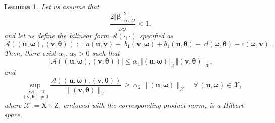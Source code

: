 \documentclass[reqno,a4paper]{article}
\numberwithin{equation}{section}
\newcommand\bu{\boldsymbol{u}}
\newcommand\bv{\boldsymbol{v}}
\newcommand\bbbeta{\boldsymbol{\beta}}
\newcommand\disp{\displaystyle}
\renewcommand\O{\Omega}
\newcommand\Z{\mathrm{Z}}
\newcommand\X{\mathrm{X}}
\newcommand\bomega{\boldsymbol{\omega}}
\newcommand\btheta{\boldsymbol{\theta}}
\newtheorem{lemma}{Lemma}[section]
\begin{document}
\begin{lemma}\label{le1:continuous-problem}
Let us assume that 
\begin{equation}\label{beta-assumption}
\frac{2\Vert\bbbeta\Vert_{\infty,\O}^2}{\nu\sigma}< 1,
\end{equation}
and let us define the bilinear form $\mathcal{A}(\cdot,\cdot)$ specified as 
$$\mathcal A((\bu,\bomega),(\bv,\btheta)):=a(\bu,\bv)+\;b_{1}(\bv,\bomega)+b_{1}(\bu,\btheta)-\;d(\bomega,\btheta)+c(\bomega,\bv).$$
Then, there exist $\alpha_1,\alpha_2>0$ such that
\begin{equation}\label{acot}
\vert\mathcal A((\bu,\bomega),(\bv,\btheta))\vert\le \alpha_1\Vert(\bu,\bomega)\Vert_{\mathcal X}\Vert(\bv,\btheta)\Vert_{\mathcal X},
\end{equation}
and
\begin{equation}\label{cont-inf-sup-Aa}
\disp\,\sup_{\stackrel{\scriptstyle (\bv,\btheta)\in {\mathcal X}}{(\bv,\btheta)\ne0}}
\frac{\mathcal A((\bu,\bomega),(\bv,\btheta))}{\|(\bv,\btheta)\|_{\mathcal X}}\,\ge\,\alpha_2\,\|(\bu,\bomega)\|_{\mathcal X}
\quad\forall\,(\bu,\bomega)\in \mathcal X,
\end{equation}
where $\mathcal X:=\X\times\Z$, endowed
with the corresponding product norm, is a Hilbert space.
\end{lemma}
\end{document}
